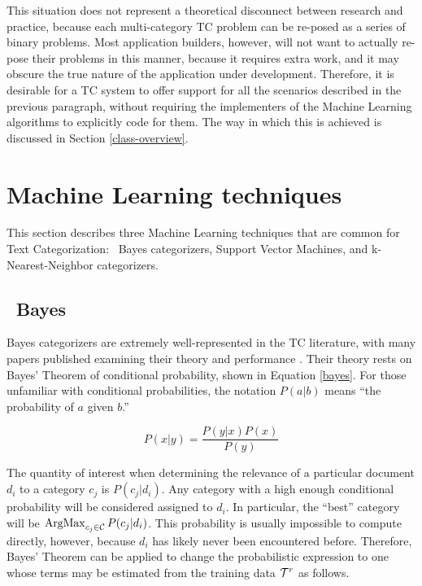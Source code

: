 This situation does not represent a theoretical disconnect between
research and practice, because each multi-category TC problem can be
re-posed as a series of binary problems.  Most application builders,
however, will not want to actually re-pose their problems in this
manner, because it requires extra work, and it may obscure the true
nature of the application under development.  Therefore, it is
desirable for a TC system to offer support for all the scenarios
described in the previous paragraph, without requiring the
implementers of the Machine Learning algorithms to explicitly code for
them.  The way in which this is achieved is discussed in Section
\ref{class-overview}.

\section{Machine Learning techniques}
\label{machine-learning}

This section describes three Machine Learning techniques that are
common for Text Categorization: \naive\ Bayes categorizers, Support
Vector Machines, and k-Nearest-Neighbor categorizers.

\subsection{\naive\ Bayes}

\naive Bayes categorizers are extremely well-represented in the TC
literature, with many papers published examining their theory and
performance \cite{lewis:98,yang:99,sebastiani:02}.
Their theory rests on Bayes' Theorem of conditional probability, shown
in Equation \ref{bayes}.  For those unfamiliar with conditional
probabilities, the notation $P(a|b)$ means ``the probability of $a$
given $b$.''

\begin{equation} \label{bayes}
P(x|y) = \frac{P(y|x) P(x)}{P(y)}
\end{equation}

The quantity of interest when determining the relevance of a
particular document $d_i$ to a category $c_j$ is $P(c_j|d_i)$.  Any
category with a high enough conditional probability will be considered
assigned to $d_i$.  In particular, the ``best'' category will be
$\operatorname*{ArgMax}_{c_j\in\mathcal{C}} P(c_j|d_i)$. This probability is usually impossible to
compute directly, however, because $d_i$ has likely never been
encountered before.  Therefore, Bayes' Theorem can be applied to
change the probabilistic expression to one whose terms may be
estimated from the training data $\mathcal{T}^r$ as follows.

